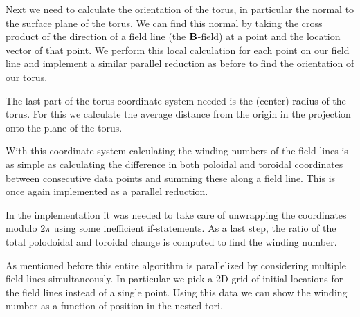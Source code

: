 \documentclass[a4paper]{article}
\renewcommand{\vec}{\bold}
\begin{document}
Next we need to calculate the orientation of the torus, in particular the normal to the surface plane of the torus. 
We can find this normal by taking the cross product of the direction of a field line (the $\vec{B}$-field) at a point and the location vector of that point. We perform this local calculation for each point on our field line and implement a similar parallel reduction as before to find the orientation of our torus.

The last part of the torus coordinate system needed is the (center) radius of the torus. For this we calculate the average distance from the origin in the projection onto the plane of the torus. %

With this coordinate system calculating the winding numbers of the field lines is as simple as calculating the difference in both poloidal and toroidal coordinates between consecutive data points and summing these along a field line. This is once again implemented as a parallel reduction.

In the implementation it was needed to take care of unwrapping the coordinates modulo $2\pi$ using some inefficient if-statements. %
As a last step, the ratio of the total polodoidal and toroidal change is computed to find the winding number.

As mentioned before this entire algorithm is parallelized by considering multiple field lines simultaneously. In particular we pick a 2D-grid of initial locations for the field lines instead of a single point. Using this data we can show the winding number as a function of position in the nested tori.\\
\end{document}
